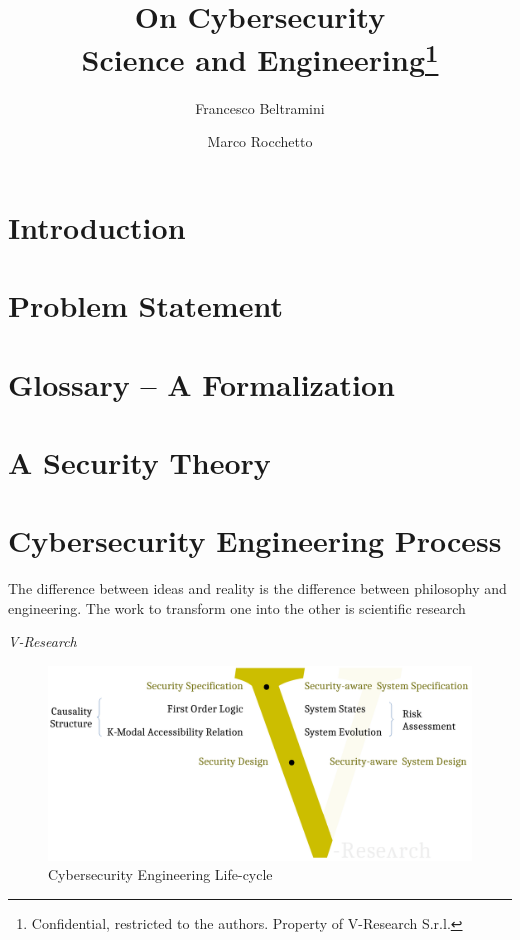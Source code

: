 \documentclass{article}
\date{}                     %
\theoremstyle{definition}
\theoremstyle{corollary}
\theoremstyle{lemma}
\theoremstyle{theorem}
\theoremstyle{theorem}
\begin{document}
\title{On Cybersecurity\\Science and Engineering\footnote{Confidential, restricted to the authors. Property of V-Research S.r.l.}}
\author[1]{Francesco Beltramini}
\author[1]{Marco Rocchetto}

\maketitle

\begin{abstract}
 
\end{abstract}
\newpage

\section{Introduction}\label{sec:intro}


\section{Problem Statement}\label{sec:problem}


\section{Glossary -- A Formalization}\label{sec:glossary}


\section{A Security Theory}\label{sec:theory}


\section{Cybersecurity Engineering Process}\label{sec:process}
\epigraph{The difference between ideas and reality is the
difference between philosophy and engineering. The work to transform one into
the other is scientific research}{{\itshape V-Research}}
\begin{figure}[t]
	\centering
	\includegraphics[width=\textwidth]{vmodel.pdf}
	\caption{Cybersecurity Engineering Life-cycle}
	\label{fig:knowledge-belief}
\end{figure}
\end{document}
